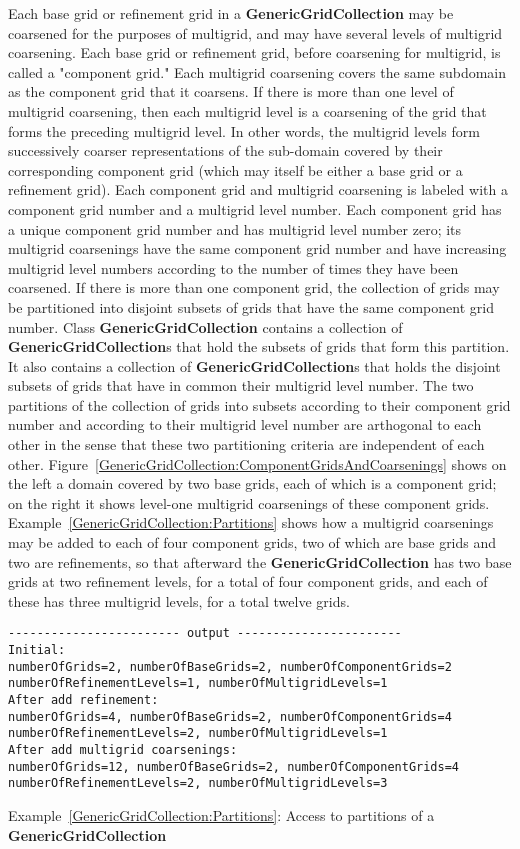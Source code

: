 \documentclass{article}
\begin{document}
Each base grid or refinement grid in a \textbf{GenericGridCollection} may be coarsened for the purposes of multigrid, and may have
several levels of multigrid coarsening.  Each base grid or refinement grid, before coarsening for multigrid, is called a "component
grid."  Each multigrid coarsening covers the same subdomain as the component grid that it coarsens.  If there is more than one level
of multigrid coarsening, then each multigrid level is a coarsening of the grid that forms the preceding multigrid level.  In other
words, the multigrid levels form successively coarser representations of the sub-domain covered by their corresponding component grid
(which may itself be either a base grid or a refinement grid).  Each component grid and multigrid coarsening is labeled with a component
grid number and a multigrid level number.  Each component grid has a unique component grid number and has multigrid level number zero;
its multigrid coarsenings have the same component grid number and have increasing multigrid level numbers according to the number of times
they have been coarsened.  If there is more than one component grid, the collection of grids may be partitioned into disjoint subsets of
grids that have the same component grid number.  Class \textbf{GenericGridCollection} contains a collection of
\textbf{GenericGridCollection}s that hold the subsets of grids that form this partition.  It also contains a collection of
\textbf{GenericGridCollection}s that holds the disjoint subsets of grids that have in common their multigrid level number.  The
two partitions of the collection of grids into subsets according to their component grid number and according to their multigrid level
number are arthogonal to each other in the sense that these two partitioning criteria are independent of each other.
Figure~\ref{GenericGridCollection:ComponentGridsAndCoarsenings} shows on the left a domain covered by two base grids, each of
which is a component grid; on the right it shows level-one multigrid coarsenings of these component grids.
Example~\ref{GenericGridCollection:Partitions} shows how a multigrid coarsenings may be added to each of four
component grids, two of which are base grids and two are refinements, so that afterward the \textbf{GenericGridCollection} has two
base grids at two refinement levels, for a total of four component grids, and each of these has three multigrid levels, for a total twelve
grids.

{\small
{}
\begin{verbatim}
------------------------ output -----------------------
Initial:
numberOfGrids=2, numberOfBaseGrids=2, numberOfComponentGrids=2
numberOfRefinementLevels=1, numberOfMultigridLevels=1
After add refinement:
numberOfGrids=4, numberOfBaseGrids=2, numberOfComponentGrids=4
numberOfRefinementLevels=2, numberOfMultigridLevels=1
After add multigrid coarsenings:
numberOfGrids=12, numberOfBaseGrids=2, numberOfComponentGrids=4
numberOfRefinementLevels=2, numberOfMultigridLevels=3
\end{verbatim}
}
{\center Example~\ref{GenericGridCollection:Partitions}: Access to partitions of a \textbf{GenericGridCollection}\label{GenericGridCollection:Partitions}}
\end{document}
